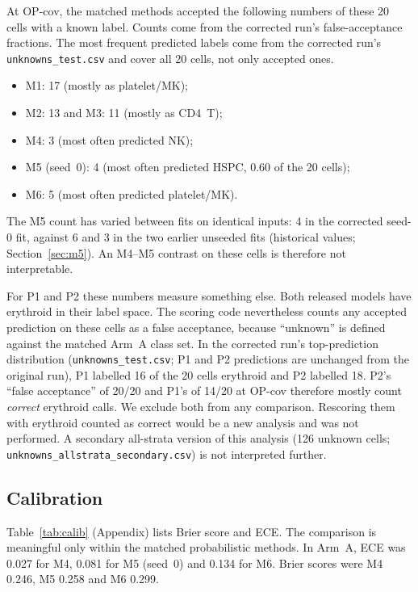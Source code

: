 \documentclass[11pt]{article}
\begin{document}
At OP-cov, the matched methods accepted the following numbers of these 20 cells with a known label. Counts come from the corrected run's false-acceptance fractions. The most frequent predicted labels come from the corrected run's \nolinkurl{unknowns_test.csv} and cover all 20 cells, not only accepted ones.
\begin{itemize}
\item M1: 17 (mostly as platelet/MK);
\item M2: 13 and M3: 11 (mostly as CD4~T);
\item M4: 3 (most often predicted NK);
\item M5 (seed~0): 4 (most often predicted HSPC, 0.60 of the 20 cells);
\item M6: 5 (most often predicted platelet/MK).
\end{itemize}
The M5 count has varied between fits on identical inputs: 4 in the corrected seed-0 fit, against 6 and 3 in the two earlier unseeded fits (historical values; Section~\ref{sec:m5}). An M4--M5 contrast on these cells is therefore not interpretable.

For P1 and P2 these numbers measure something else. Both released models have erythroid in their label space. The scoring code nevertheless counts any accepted prediction on these cells as a false acceptance, because ``unknown'' is defined against the matched Arm~A class set. In the corrected run's top-prediction distribution (\nolinkurl{unknowns_test.csv}; P1 and P2 predictions are unchanged from the original run), P1 labelled 16 of the 20 cells erythroid and P2 labelled 18. P2's ``false acceptance'' of 20/20 and P1's of 14/20 at OP-cov therefore mostly count \emph{correct} erythroid calls. We exclude both from any comparison. Rescoring them with erythroid counted as correct would be a new analysis and was not performed. A secondary all-strata version of this analysis (126 unknown cells; \nolinkurl{unknowns_allstrata_secondary.csv}) is not interpreted further.

\subsection{Calibration}

Table~\ref{tab:calib} (Appendix) lists Brier score and ECE. The comparison is meaningful only within the matched probabilistic methods. In Arm~A, ECE was 0.027 for M4, 0.081 for M5 (seed~0) and 0.134 for M6. Brier scores were M4 0.246, M5 0.258 and M6 0.299.
\end{document}
